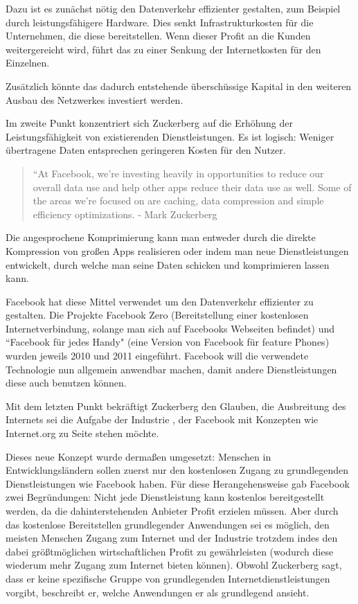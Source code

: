 \documentclass{article}
\begin{document}
Dazu ist es zunächst nötig den Datenverkehr effizienter gestalten, zum Beispiel durch leistungsfähigere Hardware.
Dies senkt Infrastrukturkosten für die Unternehmen, die diese bereitstellen.
Wenn dieser Profit an die Kunden weitergereicht wird, führt das zu einer Senkung der Internetkosten für den Einzelnen.

Zusätzlich könnte das dadurch entstehende überschüssige Kapital in den weiteren Ausbau des Netzwerkes investiert werden.

\medskip

Im zweite Punkt konzentriert sich Zuckerberg auf die Erhöhung der Leistungsfähigkeit von existierenden Dienstleistungen.
Es ist logisch: Weniger übertragene Daten entsprechen geringeren Kosten für den Nutzer.

\begin{quote}
``At Facebook, we’re investing heavily in opportunities to reduce our overall data use and help  other apps     
reduce their data use as well. Some of the areas we’re focused on are caching, data compression and simple efficiency optimizations.
- Mark Zuckerberg \textcite[8]{HumanRight}
\end{quote}

Die angesprochene Komprimierung kann man entweder durch die direkte Kompression von großen Apps realisieren oder indem man neue Dienstleistungen entwickelt, durch welche man seine Daten schicken und komprimieren lassen kann.

Facebook hat diese Mittel verwendet um den Datenverkehr effizienter zu gestalten.
Die Projekte Facebook Zero (Bereitstellung einer kostenlosen Internetverbindung, solange man sich auf Facebooks Webseiten befindet) und ``Facebook für jedes Handy" (eine Version von Facebook für feature Phones) wurden jeweils  2010 und 2011 eingeführt.
Facebook will die verwendete Technologie nun allgemein anwendbar machen, damit andere Dienstleistungen diese auch benutzen können.

\medskip

Mit dem letzten Punkt bekräftigt Zuckerberg den Glauben, die Ausbreitung des Internets sei die Aufgabe der Industrie , der Facebook mit Konzepten wie Internet.org zu Seite stehen möchte.

Dieses neue Konzept wurde dermaßen umgesetzt: Menschen in Entwicklungsländern sollen zuerst nur den kostenlosen Zugang zu grundlegenden Dienstleistungen wie Facebook haben.
Für diese Herangehensweise gab Facebook zwei Begründungen:
\medskip
Nicht jede Dienstleistung kann kostenlos bereitgestellt werden, da die dahinterstehenden Anbieter Profit erzielen müssen. 
Aber durch das kostenlose Bereitstellen grundlegender Anwendungen sei es möglich, den meisten Menschen Zugang zum Internet und der Industrie trotzdem indes den dabei größtmöglichen wirtschaftlichen Profit zu gewährleisten (wodurch diese wiederum mehr Zugang zum Internet bieten können).
Obwohl Zuckerberg sagt, dass er keine spezifische Gruppe von grundlegenden Internetdienstleistungen vorgibt, beschreibt er, welche Anwendungen er als grundlegend ansieht.
\end{document}
